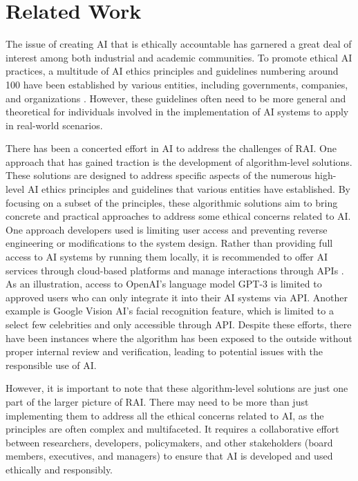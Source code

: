 \documentclass[conference]{IEEEtran}
\begin{document}
\section{Related Work}
The issue of creating AI that is ethically accountable has garnered a great deal of interest among both industrial and academic communities. To promote ethical AI practices, a multitude of AI ethics principles and guidelines numbering around 100 have been established by various entities, including governments, companies, and organizations \cite{GlobalLandscape}. 
However, these guidelines often need to be more general and theoretical for individuals involved in the implementation of AI systems to apply in real-world scenarios.

There has been a concerted effort in AI to address the challenges of RAI. One approach that has gained traction is the development of algorithm-level solutions. 
These solutions are designed to address specific aspects of the numerous high-level AI ethics principles and guidelines that various entities have established. 
By focusing on a subset of the principles, these algorithmic solutions aim to bring concrete and practical approaches to address some ethical concerns related to AI. 
One approach developers used is limiting user access and preventing reverse engineering or modifications to the system design. 
Rather than providing full access to AI systems by running them locally, it is recommended to offer AI services through cloud-based platforms and manage interactions through APIs \cite{TobyAPI}. 
As an illustration, access to OpenAI's language model GPT-3 is limited to approved users who can only integrate it into their AI systems via API. Another example is Google Vision AI's facial recognition feature, which is limited to a select few celebrities and only accessible through API. Despite these efforts, there have been instances where the algorithm has been exposed to the outside without proper internal review and verification, leading to potential issues with the responsible use of AI.

However, it is important to note that these algorithm-level solutions are just one part of the larger picture of RAI. 
There may need to be more than just implementing them to address all the ethical concerns related to AI, as the principles are often complex and multifaceted. It requires a collaborative effort between researchers, developers, policymakers, and other stakeholders (board members, executives, and managers) to ensure that AI is developed and used ethically and responsibly.
\end{document}

